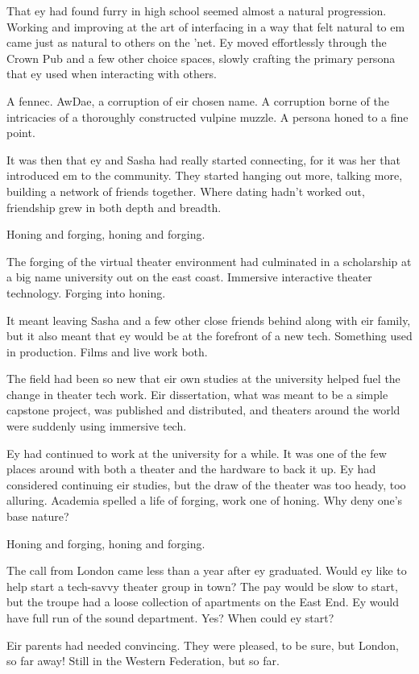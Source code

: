 That ey had found furry in high school seemed almost a natural progression. Working and improving at the art of interfacing in a way that felt natural to em came just as natural to others on the 'net. Ey moved effortlessly through the Crown Pub and a few other choice spaces, slowly crafting the primary persona that ey used when interacting with others.

A fennec. AwDae, a corruption of eir chosen name. A corruption borne of the intricacies of a thoroughly constructed vulpine muzzle. A persona honed to a fine point.

It was then that ey and Sasha had really started connecting, for it was her that introduced em to the community. They started hanging out more, talking more, building a network of friends together. Where dating hadn't worked out, friendship grew in both depth and breadth.

Honing and forging, honing and forging.

The forging of the virtual theater environment had culminated in a scholarship at a big name university out on the east coast. Immersive interactive theater technology. Forging into honing.

It meant leaving Sasha and a few other close friends behind along with eir family, but it also meant that ey would be at the forefront of a new tech. Something used in production. Films and live work both.

The field had been so new that eir own studies at the university helped fuel the change in theater tech work. Eir dissertation, what was meant to be a simple capstone project, was published and distributed, and theaters around the world were suddenly using immersive tech.

Ey had continued to work at the university for a while. It was one of the few places around with both a theater and the hardware to back it up. Ey had considered continuing eir studies, but the draw of the theater was too heady, too alluring. Academia spelled a life of forging, work one of honing. Why deny one's base nature?

Honing and forging, honing and forging.

The call from London came less than a year after ey graduated. Would ey like to help start a tech-savvy theater group in town? The pay would be slow to start, but the troupe had a loose collection of apartments on the East End. Ey would have full run of the sound department. Yes? When could ey start?

Eir parents had needed convincing. They were pleased, to be sure, but London, so far away! Still in the Western Federation, but so far.


